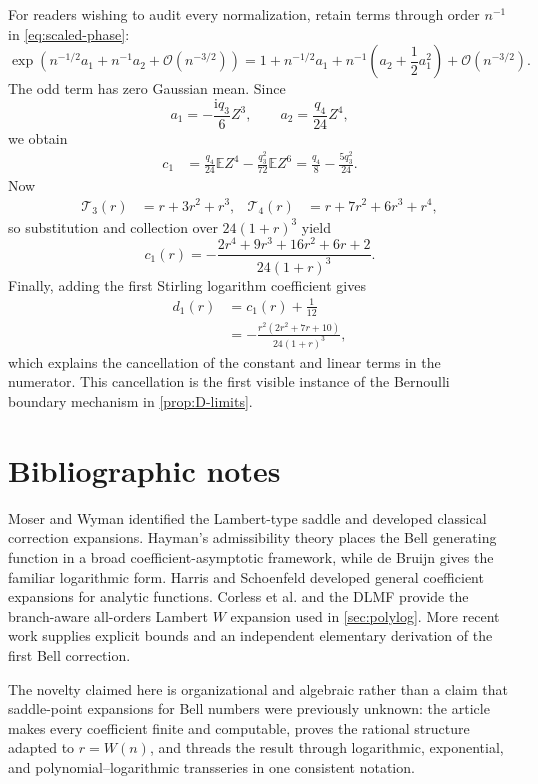 \documentclass[11pt,a4paper]{article}
\theoremstyle{definition}
\theoremstyle{remark}
\newcommand{\Tch}{\mathscr T}
\newcommand{\E}{\mathbb E}
\newcommand{\ii}{\mathrm i}
\newcommand{\BigO}{\mathcal O}
\begin{document}
For readers wishing to audit every normalization, retain terms through order
\(n^{-1}\) in \cref{eq:scaled-phase}:
\begin{equation}\label{eq:first-local-phase}
 \exp\!\left(n^{-1/2}a_1+n^{-1}a_2+\BigO(n^{-3/2})\right)
 =1+n^{-1/2}a_1+n^{-1}\left(a_2+\frac12a_1^2\right)
  +\BigO(n^{-3/2}).
\end{equation}
The odd term has zero Gaussian mean.  Since
\[
 a_1=-\frac{\ii q_3}{6}Z^3,
 \qquad
 a_2=\frac{q_4}{24}Z^4,
\]
we obtain
\begin{align}
 c_1
 &=\frac{q_4}{24}\E Z^4
   -\frac{q_3^2}{72}\E Z^6
 =\frac{q_4}{8}-\frac{5q_3^2}{24}.
 \label{eq:c1-audit-q}
\end{align}
Now
\begin{align*}
 \Tch_3(r)&=r+3r^2+r^3,
 &\Tch_4(r)&=r+7r^2+6r^3+r^4,
\end{align*}
so substitution and collection over \(24(1+r)^3\) yield
\[
 c_1(r)=-\frac{2r^4+9r^3+16r^2+6r+2}{24(1+r)^3}.
\]
Finally, adding the first Stirling logarithm coefficient gives
\begin{align*}
 d_1(r)
 &=c_1(r)+\frac1{12}\\
 &=-\frac{r^2(2r^2+7r+10)}{24(1+r)^3},
\end{align*}
which explains the cancellation of the constant and linear terms in the
numerator.  This cancellation is the first visible instance of the Bernoulli
boundary mechanism in \cref{prop:D-limits}.

\section{Bibliographic notes}\label{app:bibnotes}

Moser and Wyman identified the Lambert-type saddle and developed classical
correction expansions.  Hayman's admissibility theory places the Bell
generating function in a broad coefficient-asymptotic framework, while de
Bruijn gives the familiar logarithmic form.  Harris and Schoenfeld developed
general coefficient expansions for analytic functions.  Corless et al. and
the DLMF provide the branch-aware all-orders Lambert \(W\) expansion used in
\cref{sec:polylog}.  More recent work supplies explicit bounds and an
independent elementary derivation of the first Bell correction.

The novelty claimed here is organizational and algebraic rather than a claim
that saddle-point expansions for Bell numbers were previously unknown: the
article makes every coefficient finite and computable, proves the rational
structure adapted to \(r=W(n)\), and threads the result through logarithmic,
exponential, and polynomial--logarithmic transseries in one consistent
notation.
\end{document}
